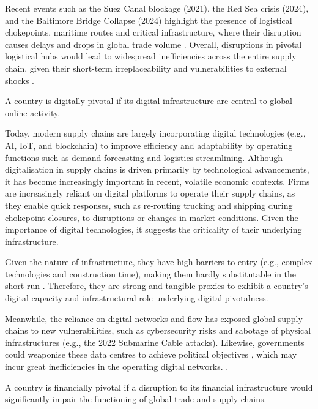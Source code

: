 \documentclass[11pt]{article}
\def\highlight#1#2{
	\begin{centering}
    
		\vspace{1.2ex}
		\begin{minipage}{0.8\linewidth}
			\begin{tcolorbox}[
				boxsep=3.3pt,
				boxrule=0.4pt,
				colback=white,
				colbacktitle=white,
				coltitle=black,
				colframe=black,
				title=\centering \textbf{#1},
			]
				\centering
				#2
			\end{tcolorbox}
		\end{minipage}
		\vspace{1.2ex}
        
	\end{centering}
}
\begin{document}
Recent events such as the Suez Canal blockage (2021), the Red Sea crisis (2024), and the Baltimore Bridge Collapse (2024) highlight the presence of logistical chokepoints, maritime routes and critical infrastructure, where their disruption causes delays and drops in global trade volume \citep{unctad2024}. Overall, disruptions in pivotal logistical hubs would lead to widespread inefficiencies across the entire supply chain, given their short-term irreplaceability and vulnerabilities to external shocks \citep{baldwin2023}.

\highlight{Pivotal Type 5: Digital}{A country is digitally pivotal if its digital infrastructure are central to global online activity.}

Today, modern supply chains are largely incorporating digital technologies (e.g., AI, IoT, and blockchain) to improve efficiency and adaptability by operating functions such as demand forecasting and logistics streamlining. Although digitalisation in supply chains is driven primarily by technological advancements, it has become increasingly important in recent, volatile economic contexts. Firms are increasingly reliant on digital platforms to operate their supply chains, as they enable quick responses, such as re-routing trucking and shipping during chokepoint closures, to disruptions or changes in market conditions. Given the importance of digital technologies, it suggests the criticality of their underlying infrastructure. 
 
Given the nature of infrastructure, they have high barriers to entry (e.g., complex technologies and construction time), making them hardly substitutable in the short run \citep{jurgens2025}. Therefore, they are strong and tangible proxies to exhibit a country’s digital capacity and infrastructural role underlying digital pivotalness. 

Meanwhile, the reliance on digital networks and flow has exposed global supply chains to new vulnerabilities, such as cybersecurity risks and sabotage of physical infrastructures (e.g., the 2022 Submarine Cable attacks). Likewise, governments could weaponise these data centres to achieve political objectives \citep{farrell2019}, which may incur great inefficiencies in the operating digital networks. . 

\highlight{Pivotal Type 6: Financial}{A country is financially pivotal if a disruption to its financial infrastructure would significantly impair the functioning of global trade and supply chains.}
\end{document}
